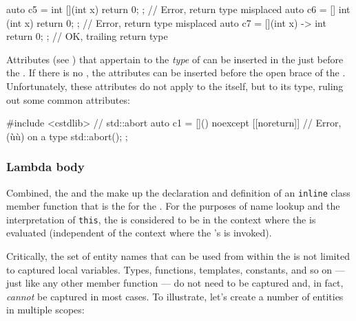 \begin{emcppslisting}
auto c5 = int [](int x){ return 0; };     // Error, return type misplaced
auto c6 = [] int (int x){ return 0; };    // Error, return type misplaced
auto c7 = [](int x) -> int{ return 0; };  // OK, trailing return type
\end{emcppslisting}
    

Attributes (see ) that appertain to the
\emph{type} of  can be inserted in the
 just before the . If there is no , the attributes can
be inserted before the open brace of the .
Unfortunately, these attributes do not apply to the  itself, but to its type, ruling out some common attributes:

\begin{emcppslisting}
#include <cstdlib>  // std::abort
auto c1 = []() noexcept [[noreturn]] {  // Error, (ù{\codeincomments{[[noreturn]]}}ù) on a type
    std::abort();
};
\end{emcppslisting}
    

\subsubsection[Lambda body]{Lambda body}\label{lambda-body}

Combined, the  and the 
make up the declaration and definition of an \lstinline!inline! class
member function that is the  for the
. For the purposes of name lookup and the
interpretation of \lstinline!this!, the  is considered
to be in the context where the  is evaluated
(independent of the context where the 's  is invoked).

Critically, the set of entity names that can be used from within the
 is not limited to captured local variables. Types,
functions, templates, constants, and so on --- just like any other
member function --- do not need to be captured and, in fact,
\emph{cannot} be captured in most cases. To illustrate, let's create a
number of entities in multiple scopes:

